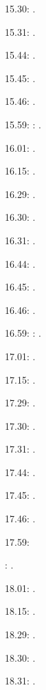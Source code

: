 \documentclass[italian]{article}
\begin{document}
15.30:     .

15.31:     .

15.44:     .

15.45:     .

15.46:     .

15.59:     
:    .

16.01:     . 

16.15:     . 

16.29:     . 

16.30:     .

16.31:     .

16.44:     .

16.45:     .

16.46:     .

16.59:     
:    .

17.01:     . 

17.15:     . 

17.29:     . 

17.30:     .

17.31:     .

17.44:     .

17.45:     .

17.46:     .

17.59:     

:    .

18.01:     . 

18.15:     . 

18.29:     . 

18.30:     .

18.31:     .
\end{document}
